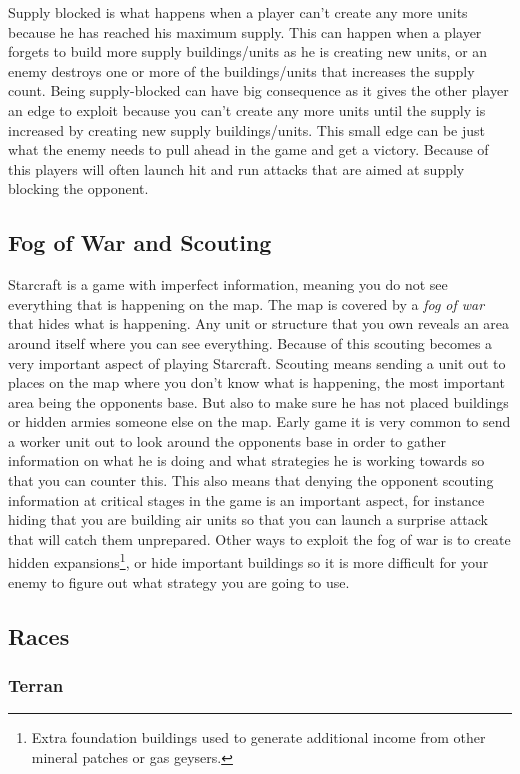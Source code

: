 Supply blocked is what happens when a player can't create any more units because
he has reached his maximum supply. This can happen when a player forgets to
build more supply buildings/units as he is creating new units, or an enemy
destroys one or more of the buildings/units that increases the supply count.
Being supply-blocked can have big consequence as it gives the other player an
edge to exploit because you can't create any more units until the supply is
increased by creating new supply buildings/units. This small edge can be just
what the enemy needs to pull ahead in the game and get a victory. Because of
this players will often launch hit and run attacks that are aimed at supply
blocking the opponent.
 
\subsection{Fog of War and Scouting}
Starcraft is a game with imperfect information, meaning you do not see
everything that is happening on the map. The map is covered by a \textit{fog
of war} that hides what is happening. Any unit or structure that you own reveals
an area around itself where you can see everything. Because of this scouting
becomes a very important aspect of playing Starcraft. Scouting means sending a
unit out to places on the map where you don't know what is happening, the most
important area being the opponents base. But also to make sure he has not placed
buildings or hidden armies someone else on the map. Early game it is very common
to send a worker unit out to look around the opponents base in order to gather
information on what he is doing and what strategies he is working towards so
that you can counter this. This also means that denying the opponent scouting
information at critical stages in the game is an important aspect, for instance
hiding that you are building air units so that you can launch a surprise attack
that will catch them unprepared. Other ways to exploit the fog of war is to
create hidden expansions\footnote{Extra foundation buildings used to generate
additional income from other mineral patches or gas geysers.}, or hide important
buildings so it is more difficult for your enemy to figure out what strategy you
are going to use. 

\subsection{Races}

\subsubsection{Terran}

